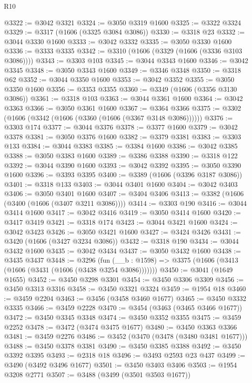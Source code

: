 \begin{lexlean}{R10}
\begin{coremodule}
@3322 := @3042 @3321
@3324 := @3050 @3319 @1600
@3325 := @3322 @3324
@3329 := @3317 (@1606 (@3325 @3084 @3086))
@3330 := @3318 @23
@3332 := @3044 @3330 @1600
@3333 := @3042 @3332
@3335 := @3050 @3330 @1600
@3336 := @3333 @3335
@3342 := @3310 (@1606 (@3329 (@1606 (@3336 @3103 @3086))))
@3343 := @3303 @103
@3345 := @3044 @3343 @1600
@3346 := @3042 @3345
@3348 := @3050 @3343 @1600
@3349 := @3346 @3348
@3350 := @3318 @62
@3352 := @3044 @3350 @1600
@3353 := @3042 @3352
@3355 := @3050 @3350 @1600
@3356 := @3353 @3355
@3360 := @3349 (@1606 (@3356 @3130 @3086))
@3361 := @3318 @103
@3363 := @3044 @3361 @1600
@3364 := @3042 @3363
@3366 := @3050 @3361 @1600
@3367 := @3364 @3366
@3375 := @3302 (@1606 (@3342 (@1606 (@3360 (@1606 (@3367 @3148 @3086))))))
@3376 := @3303 @174
@3377 := @3044 @3376
@3378 := @3377 @1600
@3379 := @3042 @3378
@3381 := @3050 @3376 @1600
@3382 := @3379 @3381
@3383 := @3303 @133
@3384 := @3044 @3383
@3385 := @3384 @1600
@3386 := @3042 @3385
@3388 := @3050 @3383 @1600
@3389 := @3386 @3388
@3390 := @3318 @122
@3392 := @3044 @3390 @1600
@3393 := @3042 @3392
@3395 := @3050 @3390 @1600
@3396 := @3393 @3395
@3400 := @3389 (@1606 (@3396 @3187 @3086))
@3401 := @3318 @133
@3403 := @3044 @3401 @1600
@3404 := @3042 @3403
@3406 := @3050 @3401 @1600
@3407 := @3404 @3406
@3413 := @3382 (@1606 (@3400 (@1606 (@3407 @3211 @3086))))
@3414 := @3303 @190
@3416 := @3044 @3414 @1600
@3417 := @3042 @3416
@3419 := @3050 @3414 @1600
@3420 := @3417 @3419
@3421 := @3318 @174
@3423 := @3044 @3421 @1600
@3424 := @3042 @3423
@3426 := @3050 @3421 @1600
@3427 := @3424 @3426
@3431 := @3420 (@1606 (@3427 @3234 @3086))
@3432 := @3318 @190
@3434 := @3044 @3432 @1600
@3435 := @3042 @3434
@3437 := @3050 @3432 @1600
@3438 := @3435 @3437
@3448 := @3296
    (fun (__b : @1598) => @3375 (@1606 (@3413 (@1606 (@3431 (@1606 (@3438 @3254 @3086)))))))
@3450 := @3041 (@1649 @1655)
@3452 := @3450 @3298 @3301
@3454 := @3450 @3306 @3309
@3456 := @3450 @3313 @3316
@3458 := @3450 @3321 @3324
@3459 := @1954 @18
@3460 := @3459 @2204
@3463 := @3456 (@3458 @3460 @1677)
@3465 := @3450 @3332 @3335
@3466 := @3459 @2228
@3470 := @3454 (@3463 (@3465 @3466 @1677))
@3472 := @3450 @3345 @3348
@3474 := @3450 @3352 @3355
@3475 := @3459 @2252
@3478 := @3472 (@3474 @3475 @1677)
@3480 := @3450 @3363 @3366
@3481 := @3459 @2276
@3486 := @3452 (@3470 (@3478 (@3480 @3481 @1677)))
@3488 := @3450 @3378 @3381
@3490 := @3450 @3385 @3388
@3492 := @3450 @3392 @3395
@3493 := @2318 @18
@3496 := @3493 @2593 @23 @437
@3499 := @3490 (@3492 @3496 @1677)
@3501 := @3450 @3403 @3406
@3503 := @1954 @3208 @2771
@3507 := @3488 (@3499 (@3501 @3503 @1677))

\end{coremodule}
\end{lexlean}
